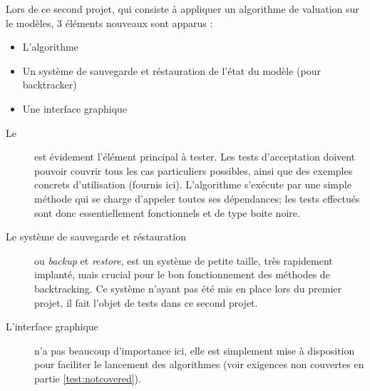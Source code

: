 

Lors de ce second projet, qui consiste à appliquer un algorithme de valuation sur le modèles, 3 éléments nouveaux sont apparus :
\begin{itemize}
	\item L'algorithme \fla
	\item Un système de sauvegarde et réstauration de l'état du modèle (pour backtracker)
	\item Une interface graphique
\end{itemize}

\begin{description}
	\item[Le \fla] est évidement l'élément principal à tester.
	Les tests d'acceptation doivent pouvoir couvrir tous les cas particuliers possibles, ainsi que des exemples concrets d'utilisation (fournis ici).
	L'algorithme s'exécute par une simple méthode qui se charge d'appeler toutes ses dépendances; les tests effectués sont donc essentiellement fonctionnels et de type boite noire.
	\item[Le système de sauvegarde et réstauration] ou \emph{backup} et \emph{restore},
	est un système de petite taille, très rapidement implanté, mais crucial pour le bon fonctionnement des méthodes de backtracking.
	Ce système n'ayant pas été mis en place lors du premier projet, il fait l'objet de tests dans ce second projet.
	\item[L'interface graphique] n'a pas beaucoup d'importance ici, elle est simplement mise à disposition pour faciliter le lancement des algorithmes (voir exigences non couvertes en partie \ref{test:notcovered}).
\end{description}







